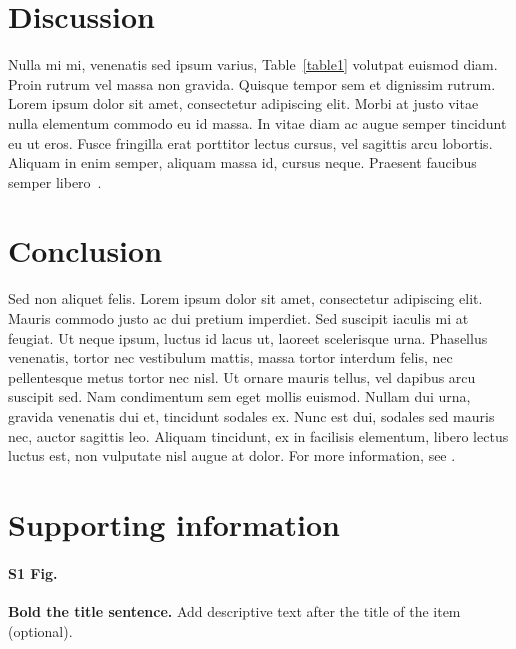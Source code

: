 \documentclass[10pt,letterpaper]{article}
\begin{document}
\section*{Discussion}
Nulla mi mi, venenatis sed ipsum varius, Table~\ref{table1} volutpat euismod diam. Proin rutrum vel massa non gravida. Quisque tempor sem et dignissim rutrum. Lorem ipsum dolor sit amet, consectetur adipiscing elit. Morbi at justo vitae nulla elementum commodo eu id massa. In vitae diam ac augue semper tincidunt eu ut eros. Fusce fringilla erat porttitor lectus cursus, vel sagittis arcu lobortis. Aliquam in enim semper, aliquam massa id, cursus neque. Praesent faucibus semper libero~\cite{bib3}.

\section*{Conclusion}


Sed non aliquet felis. Lorem ipsum dolor sit amet, consectetur adipiscing elit. Mauris commodo justo ac dui pretium imperdiet. Sed suscipit iaculis mi at feugiat. Ut neque ipsum, luctus id lacus ut, laoreet scelerisque urna. Phasellus venenatis, tortor nec vestibulum mattis, massa tortor interdum felis, nec pellentesque metus tortor nec nisl. Ut ornare mauris tellus, vel dapibus arcu suscipit sed. Nam condimentum sem eget mollis euismod. Nullam dui urna, gravida venenatis dui et, tincidunt sodales ex. Nunc est dui, sodales sed mauris nec, auctor sagittis leo. Aliquam tincidunt, ex in facilisis elementum, libero lectus luctus est, non vulputate nisl augue at dolor. For more information, see .

\section*{Supporting information}

\paragraph*{S1 Fig.}
\label{S1_Fig}
{\bf Bold the title sentence.} Add descriptive text after the title of the item (optional).
\end{document}
